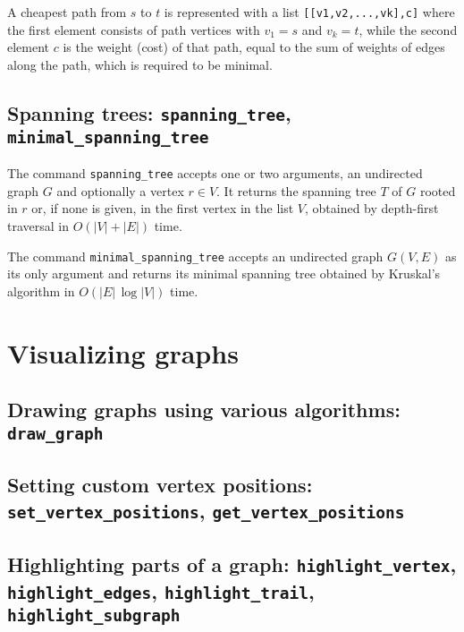 \documentclass[a4paper,11pt]{article}
\begin{document}
A cheapest path from $ s $ to $ t $ is represented with a list {\tt [[v1,v2,...,vk],c]} where the first element consists of path vertices with $ v_1=s $ and $ v_k=t $, while the second element $ c $ is the weight (cost) of that path, equal to the sum of weights of edges along the path, which is required to be minimal.

\subsection{Spanning trees: {\tt spanning\_tree}, {\tt minimal\_spanning\_tree}}

The command {\tt spanning\_tree} accepts one or two arguments, an undirected graph $ G $ and optionally a vertex $ r\in V $. It returns the spanning tree $ T $ of $ G $ rooted in $ r $ or, if none is given, in the first vertex in the list $ V $, obtained by depth-first traversal in $ O(|V|+|E|) $ time.

The command {\tt minimal\_spanning\_tree} accepts an undirected graph $ G(V,E) $ as its only argument and returns its minimal spanning tree obtained by Kruskal's algorithm in $ O(|E|\,\log|V|) $ time.

\section{Visualizing graphs}

\subsection{Drawing graphs using various algorithms: {\tt draw\_graph}}

\subsection{Setting custom vertex positions: {\tt set\_vertex\_positions}, {\tt get\_vertex\_positions}}

\subsection{Highlighting parts of a graph: {\tt highlight\_vertex}, {\tt highlight\_edges}, {\tt highlight\_trail}, {\tt highlight\_subgraph}}
\end{document}
